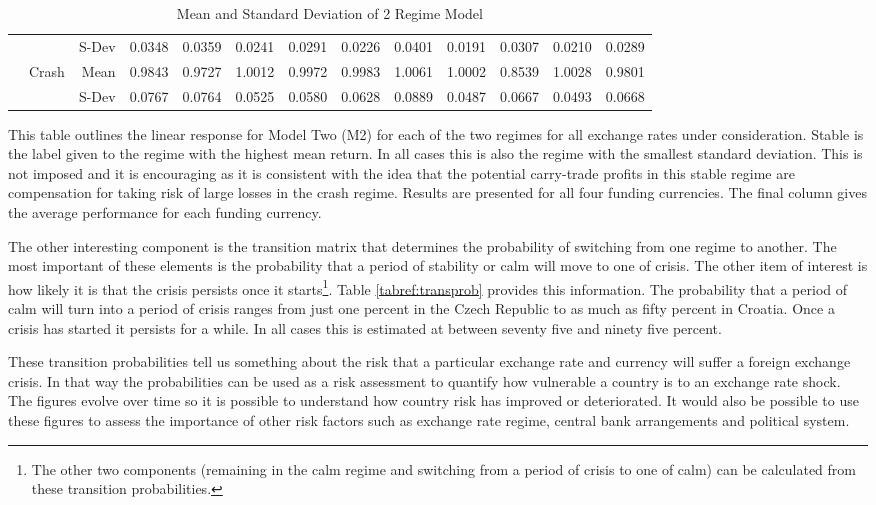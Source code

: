 \documentclass[12pt, a4paper, oneside]{article}\usepackage[]{graphicx}\usepackage[]{color}
\begin{document}
\begin{sidewaystable}[p]
\begin{threeparttable}
\begin{tabular}{llrrrrrrrrrrr}
 & & S-Dev &0.0348 & 0.0359 & 0.0241 & 0.0291 & 0.0226 & 0.0401 & 0.0191 & 0.0307 & 0.0210 & 0.0289 \\ 
  & \multirow{2}{*}{Crash}&Mean & 0.9843 & 0.9727 & 1.0012 & 0.9972 & 0.9983 & 1.0061 & 1.0002 & 0.8539 & 1.0028 & 0.9801 \\ 
  & & S-Dev& 0.0767 & 0.0764 & 0.0525 & 0.0580 & 0.0628 & 0.0889 & 0.0487 & 0.0667 & 0.0493 & 0.0668 \\ 
   \hline
\end{tabular}
\begin{tablenotes}
\small
\item
This table outlines the linear response for Model Two (M2) for each of the two regimes for all exchange rates under consideration.  Stable is the label given to the regime with the highest mean return.  In all cases this is also the regime with the smallest standard deviation. This is not imposed and it is encouraging as it is consistent with the idea that the potential carry-trade profits in this stable regime are compensation for taking risk of large losses in the crash regime.  Results are presented for all four funding currencies.  The final column gives the average performance for each funding currency.     
\end{tablenotes}
\caption{Mean and Standard Deviation of 2 Regime Model}
\label{tabref:2stateresponse}
\end{threeparttable}
  \end{sidewaystable}

The other interesting component is the transition matrix that determines the probability of switching from one regime to another. The most important of these elements is the probability that a period of stability or calm will move to one of crisis.  The other item of interest is how likely it is that the crisis persists once it starts\footnote{The other two components (remaining in the calm regime and switching from a period of crisis to one of calm) can be calculated from these transition probabilities.}.  Table \ref{tabref:transprob} provides this information.  The probability that a period of calm will turn into a period of crisis ranges from just one percent in the Czech Republic to as much as fifty percent in Croatia. Once a crisis has started it persists for a while. In all cases this is estimated at between seventy five and ninety five percent. 

These transition probabilities tell us something about the risk that a particular exchange rate and currency will suffer a foreign exchange crisis. In that way the probabilities can be used as a risk assessment to quantify how vulnerable a country is to an exchange rate shock. The figures evolve over time so it is possible to understand how country risk has improved or deteriorated.   It would also be possible to use these figures to assess the importance of other risk factors such as exchange rate regime, central bank arrangements and political system. 
\end{document}
